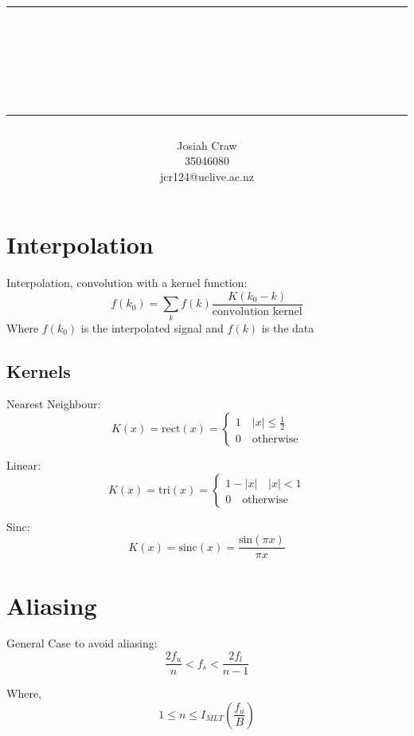 \documentclass[12pt]{article}
\author{{\LARGE Josiah Craw}\vspace{10pt}\\35046080\\jcr124@uclive.ac.nz\\}
\title{\rule{\textwidth}{0.8pt} \\ {\huge \textbf{\reportTitle}}\\{\large \subTitle} \rule{\textwidth}{0.8pt}}
\begin{document}
\maketitle
\newpage

\section{Interpolation}
Interpolation, convolution with a kernel function:
\begin{equation}
f(k_0) = \sum_k f(k) \frac{K(k_0-k)}{\textrm{convolution kernel}} 
\end{equation}
Where $f(k_0)$ is the interpolated signal and $f(k)$ is the data

\subsection{Kernels}

Nearest Neighbour:
\begin{equation}
K(x)=\textrm{rect}(x) =
\begin{cases}
    1 \quad |x| \leq \frac{1}{2}\\
    0 \quad \textrm{otherwise}
\end{cases}
\end{equation}

Linear:
\begin{equation}
    K(x)=\textrm{tri}(x) =
    \begin{cases}
        1 - |x| \quad |x| < 1\\
        0 \quad \textrm{otherwise}
    \end{cases}
\end{equation}

Sinc:
\begin{equation}
    K(x) = \textrm{sinc}(x) = \frac{\textrm{sin}(\pi x)}{\pi x}
\end{equation}

\section{Aliasing}
General Case to avoid aliasing:
\begin{equation}
    \frac{2f_u}{n} < f_s < \frac{2f_l}{n-1}
\end{equation}

Where,
\begin{equation}
    1 \leq n \leq I_{MLT}\left(\frac{f_u}{B}\right)
\end{equation}
\end{document}
